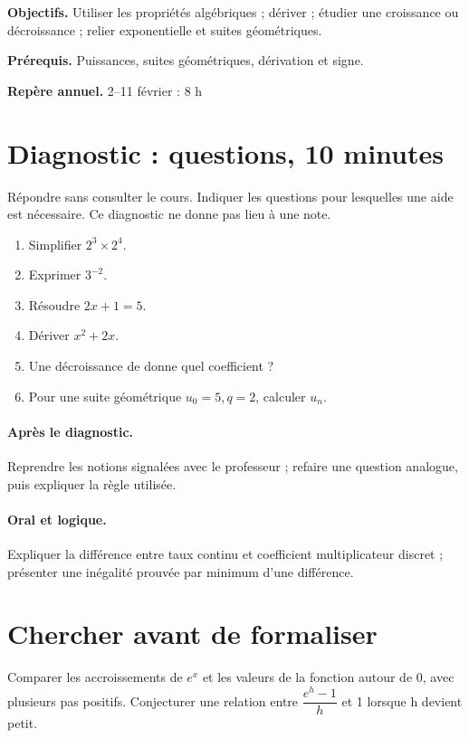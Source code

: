 \label{C09}
\begin{keypoint}
\textbf{Objectifs.} Utiliser les propriétés algébriques ; dériver ; étudier une croissance ou décroissance ; relier exponentielle et suites géométriques.

\textbf{Prérequis.} Puissances, suites géométriques, dérivation et signe.

\textbf{Repère annuel.} 2–11 février : 8 h\end{keypoint}
\section*{Diagnostic :  questions, 10 minutes}\label{C09-D}
Répondre sans consulter le cours. Indiquer les questions pour lesquelles une aide est nécessaire. Ce diagnostic ne donne pas lieu à une note.
\begin{enumerate}
\item Simplifier $2^3\times2^4$.
\item Exprimer $3^{-2}$.
\item Résoudre $2x+1=5$.
\item Dériver $x^2+2x$.
\item Une décroissance de  donne quel coefficient ?
\item Pour une suite géométrique $u_0=5,q=2$, calculer $u_n$.
\end{enumerate}
\paragraph{Après le diagnostic.} Reprendre les notions signalées avec le professeur ; refaire une question analogue, puis expliquer la règle utilisée.
\paragraph{Oral et logique.} Expliquer la différence entre taux continu et coefficient multiplicateur discret ; présenter une inégalité prouvée par minimum d’une différence.
\mxnewpage
\section*{Chercher avant de formaliser}\label{C09-RECH}
Comparer les accroissements de $e^x$ et les valeurs de la fonction autour de 0, avec plusieurs pas positifs. Conjecturer une relation entre $\dfrac{e^{h}-1}{h}$ et 1 lorsque h devient petit.
